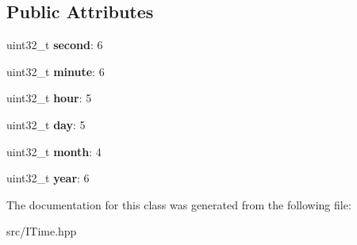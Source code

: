 \subsection*{Public Attributes}
\begin{DoxyCompactItemize}
\item 
\mbox{\label{classathome_1_1time_1_1_i_time_1_1_date_time_aa8d293191e225992f76d54a20bf20c4c}} 
uint32\+\_\+t {\bfseries second}\+: 6
\item 
\mbox{\label{classathome_1_1time_1_1_i_time_1_1_date_time_aeaf95ec7b94f3515f1351ace98abacde}} 
uint32\+\_\+t {\bfseries minute}\+: 6
\item 
\mbox{\label{classathome_1_1time_1_1_i_time_1_1_date_time_a3ca068c42464b2aedf8ad38fbf04a706}} 
uint32\+\_\+t {\bfseries hour}\+: 5
\item 
\mbox{\label{classathome_1_1time_1_1_i_time_1_1_date_time_a2c1e84fc382eba06a6271f66c2f7ca0b}} 
uint32\+\_\+t {\bfseries day}\+: 5
\item 
\mbox{\label{classathome_1_1time_1_1_i_time_1_1_date_time_a2bf001a7e2b93e0b0077dca04ef8a60d}} 
uint32\+\_\+t {\bfseries month}\+: 4
\item 
\mbox{\label{classathome_1_1time_1_1_i_time_1_1_date_time_a7331035799fc6b1c66c61cbbcbfbeb1e}} 
uint32\+\_\+t {\bfseries year}\+: 6
\end{DoxyCompactItemize}


The documentation for this class was generated from the following file\+:\begin{DoxyCompactItemize}
\item 
src/I\+Time.\+hpp\end{DoxyCompactItemize}
